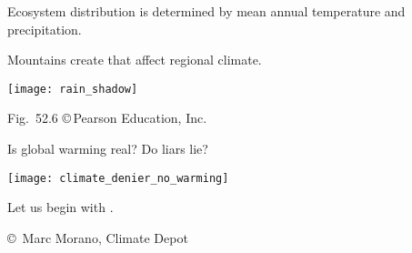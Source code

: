 \documentclass[t]{beamer}
\begin{document}
{
	\begin{frame}[b]{Ecosystem distribution is determined by mean annual temperature and precipitation.}
		
	\end{frame}
}
%
\begin{frame}[t]{Mountains create  that affect regional climate.}
	
	\bigskip
	
	\texttt{[image: rain\_shadow]}
	
	\vfilll
	
	\hfill \tiny Fig.~52.6 \copyright\,Pearson Education, Inc.
\end{frame}
%
{
	\begin{frame}[b]
		
	\end{frame}
}
%
\begin{frame}[t]{Is global warming real? Do liars lie?}
	\begin{center}
		\texttt{[image: climate\_denier\_no\_warming]}
	\end{center}

	Let us begin with .
	
	\vfilll
	
	\hfill \tiny \copyright~Marc Morano, Climate Depot
\end{frame}

%

\end{document}
